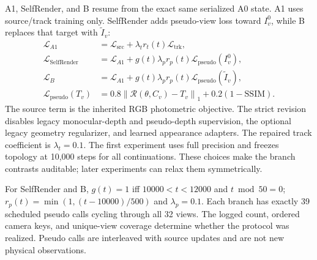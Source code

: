 \documentclass[10pt,twocolumn,letterpaper]{article}
\newcommand{\norm}[1]{\left\lVert#1\right\rVert}
\newcommand{\cL}{\mathcal{L}}
\begin{document}
A1, SelfRender, and B resume from the exact same serialized A0 state. A1 uses source/track training only. SelfRender adds pseudo-view loss toward $I^0_v$, while B replaces that target with $\widetilde I_v$:
\begin{align}
\cL_{A1}&=\cL_{\mathrm{src}}+\lambda_t r_t(t)\cL_{\mathrm{trk}},\\
\cL_{\mathrm{SelfRender}}&=\cL_{A1}+g(t)\lambda_p r_p(t)\cL_{\mathrm{pseudo}}(I^0_v),\\
\cL_B&=\cL_{A1}+g(t)\lambda_p r_p(t)\cL_{\mathrm{pseudo}}(\widetilde I_v),\\
\cL_{\mathrm{pseudo}}(T_v)&=0.8\norm{\mathcal R(\theta,C_v)-T_v}_1
+0.2(1-\mathrm{SSIM}).
\label{eq:lossb}
\end{align}
The source term is the inherited RGB photometric objective. The strict revision disables legacy monocular-depth and pseudo-depth supervision, the optional legacy geometry regularizer, and learned appearance adapters. The repaired track coefficient is $\lambda_t=0.1$. The first experiment uses full precision and freezes topology at 10,000 steps for all continuations. These choices make the branch contrasts auditable; later experiments can relax them symmetrically.

For SelfRender and B, $g(t)=1$ iff $10000<t<12000$ and $t\bmod50=0$; $r_p(t)=\min(1,(t-10000)/500)$ and $\lambda_p=0.1$. Each branch has exactly 39 scheduled pseudo calls cycling through all 32 views. The logged count, ordered camera keys, and unique-view coverage determine whether the protocol was realized. Pseudo calls are interleaved with source updates and are not new physical observations.
\end{document}
